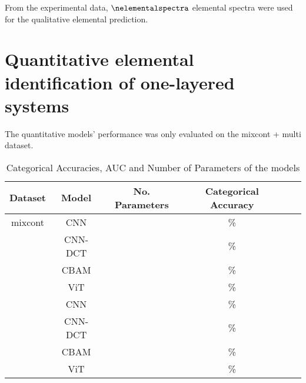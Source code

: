From the experimental data, $\nelementalspectra$ elemental spectra were used for the qualitative elemental prediction. 


\section{Quantitative elemental identification of one-layered systems}

The quantitative models' performance was only evaluated on the mixcont + multi dataset. 

\begin{table}[H]
    \centering
    \begin{tabular}{c|c|c|c|c|c}
        Dataset & Model   & No. Parameters & Categorical Accuracy      \\
        \hline
        mixcont & CNN     &                 &             \% \\
                & CNN-DCT &                 &             \% \\
                & CBAM    &                 &             \% \\
                & ViT     &                 &             \% \\
                & CNN     &                 &             \%  \\
                & CNN-DCT &                 &             \%  \\
                & CBAM    &                 &             \% \\
                & ViT     &                 &             \% \\
    \end{tabular}
    \caption{Categorical Accuracies, AUC and Number of Parameters of the models}
    \label{tab:acc_qual}
\end{table}



